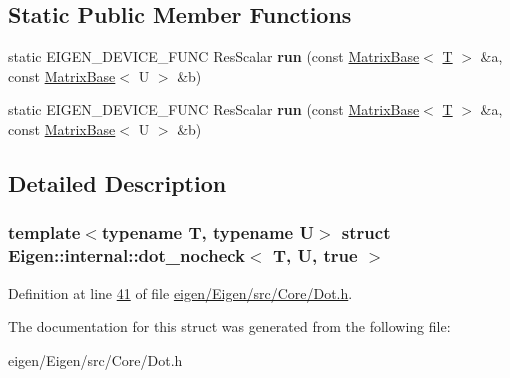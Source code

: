 \subsection*{Static Public Member Functions}
\begin{DoxyCompactItemize}
\item 
\mbox{\label{struct_eigen_1_1internal_1_1dot__nocheck_3_01_t_00_01_u_00_01true_01_4_a036e31d72fa2a542c8c922d0aefacf79}} 
static E\+I\+G\+E\+N\+\_\+\+D\+E\+V\+I\+C\+E\+\_\+\+F\+U\+NC Res\+Scalar {\bfseries run} (const \hyperlink{group___core___module_class_eigen_1_1_matrix_base}{Matrix\+Base}$<$ \hyperlink{group___sparse_core___module}{T} $>$ \&a, const \hyperlink{group___core___module_class_eigen_1_1_matrix_base}{Matrix\+Base}$<$ U $>$ \&b)
\item 
\mbox{\label{struct_eigen_1_1internal_1_1dot__nocheck_3_01_t_00_01_u_00_01true_01_4_a036e31d72fa2a542c8c922d0aefacf79}} 
static E\+I\+G\+E\+N\+\_\+\+D\+E\+V\+I\+C\+E\+\_\+\+F\+U\+NC Res\+Scalar {\bfseries run} (const \hyperlink{group___core___module_class_eigen_1_1_matrix_base}{Matrix\+Base}$<$ \hyperlink{group___sparse_core___module}{T} $>$ \&a, const \hyperlink{group___core___module_class_eigen_1_1_matrix_base}{Matrix\+Base}$<$ U $>$ \&b)
\end{DoxyCompactItemize}


\subsection{Detailed Description}
\subsubsection*{template$<$typename T, typename U$>$\newline
struct Eigen\+::internal\+::dot\+\_\+nocheck$<$ T, U, true $>$}



Definition at line \hyperlink{eigen_2_eigen_2src_2_core_2_dot_8h_source_l00041}{41} of file \hyperlink{eigen_2_eigen_2src_2_core_2_dot_8h_source}{eigen/\+Eigen/src/\+Core/\+Dot.\+h}.



The documentation for this struct was generated from the following file\+:\begin{DoxyCompactItemize}
\item 
eigen/\+Eigen/src/\+Core/\+Dot.\+h\end{DoxyCompactItemize}
